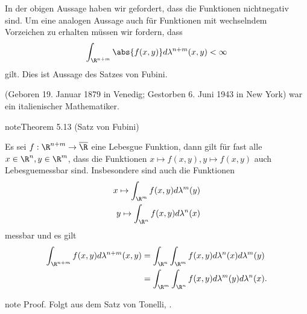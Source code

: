 \documentclass[letterpaper,10pt,german]{jupyterBook}
\begin{document}
\sphinxAtStartPar
In der obigen Aussage haben wir gefordert, dass die Funktionen nicht\sphinxhyphen{}negativ sind. Um eine analogen Aussage auch für Funktionen mit wechselndem Vorzeichen zu erhalten müssen wir fordern, dass
\begin{equation*}
\begin{split}\int_{\R^{n+m}} \abs{f(x,y)} d\lambda^{n+m}(x,y) <\infty\end{split}
\end{equation*}
\sphinxAtStartPar
gilt. Dies ist Aussage des Satzes von Fubini.

\begin{sphinxShadowBox}

\sphinxAtStartPar
{} (Geboren 19. Januar 1879 in Venedig; Gestorben 6. Juni 1943 in New York) war ein italienischer Mathematiker.
\end{sphinxShadowBox}
\label{masstheorie/integrationstechnik:thm:fubini}
\begin{sphinxadmonition}{note}{Theorem 5.13 (Satz von Fubini)}



\sphinxAtStartPar
Es sei \(f:\R^{n+m}\to \overline{\R}\) eine Lebesgue\sphinxhyphen{} Funktion, dann gilt für fast alle \(x\in\R^n,y\in\R^m\), dass die Funktionen \(x\mapsto f(x,y), y\mapsto f(x,y)\) auch Lebesgue\sphinxhyphen{}messbar sind. Insbesondere sind auch die Funktionen
\begin{equation*}
\begin{split}x \mapsto \int_{\R^m} f(x,y) d\lambda^m(y)\\
y \mapsto \int_{\R^n} f(x,y) d\lambda^n(x)\end{split}
\end{equation*}
\sphinxAtStartPar
messbar und es gilt
\begin{equation*}
\begin{split}\int_{\R^{n+m}} f(x,y) d\lambda^{n+m}(x,y) &= \int_{\R^n}\int_{\R^m} f(x,y) d\lambda^{n}(x)d\lambda^m(y)\\
&=
\int_{\R^m}\int_{\R^n} f(x,y) d\lambda^{m}(y)d\lambda^n(x).\end{split}
\end{equation*}\end{sphinxadmonition}

\begin{sphinxadmonition}{note}
\sphinxAtStartPar
Proof. Folgt aus dem Satz von Tonelli, {\hyperref[\detokenize{masstheorie/integrationstechnik:thm:tonelli}]{}}.
\end{sphinxadmonition}
\end{document}

